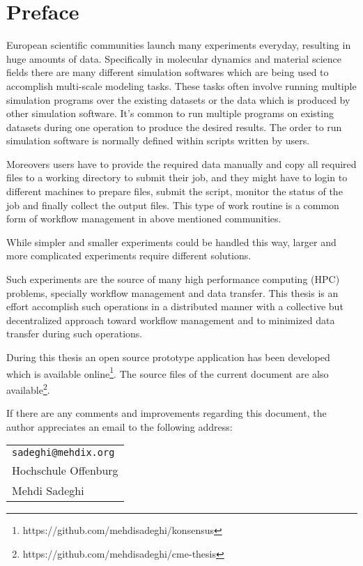 \chapter*{Preface}
\label{cha:preface}

European scientific communities launch many experiments everyday, resulting in huge amounts
of data. Specifically in molecular dynamics and material science fields there are many different
simulation softwares which are being used to accomplish multi-scale modeling tasks. These tasks
often involve running multiple simulation programs over the existing datasets or the data which is
produced by other simulation software. It's common to run multiple programs on existing datasets
during one operation to produce the desired results. The order to run simulation software is normally 
defined within scripts written by users. 

Moreovers users have to provide the required data manually and copy all required files to a working
directory to submit their job, and they might have to login to different machines to prepare files,
submit the script, monitor the status of the job and finally collect the output files. 
This type of work routine is a common form of workflow management in above mentioned communities.

While simpler and smaller experiments could be handled this way, larger and more complicated experiments
require different solutions. 

Such experiments are the source of many high performance computing (HPC) problems, specially workflow management and data transfer.
This thesis is an effort accomplish such operations in a distributed manner with a 
collective but decentralized approach toward workflow management and to minimized data transfer during such operations.

During this thesis an open source prototype application has been developed which is available online\footnote{https://github.com/mehdisadeghi/konsensus}. The source files
of the current document are also available\footnote{https://github.com/mehdisadeghi/cme-thesis}.


If there are any comments and improvements regarding this document, the author
appreciates an email to the following address:

\begin{center}
\begin{tabular}{l}
\nolinkurl{sadeghi@mehdix.org} \\
Hochschule Offenburg\\
Mehdi Sadeghi
\end{tabular}
\end{center}